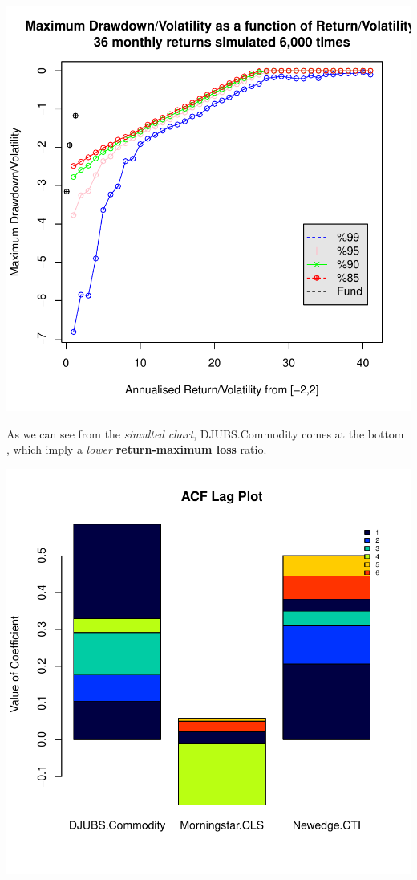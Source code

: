 \documentclass[12pt,letterpaper,english]{article}
\begin{document}
\includegraphics{CommodityReport-010}

As we can see from the \emph{simulted chart}, DJUBS.Commodity comes at the bottom , which imply a \emph{lower} \textbf{return-maximum loss} ratio.

\includegraphics{CommodityReport-011}
\end{document}
